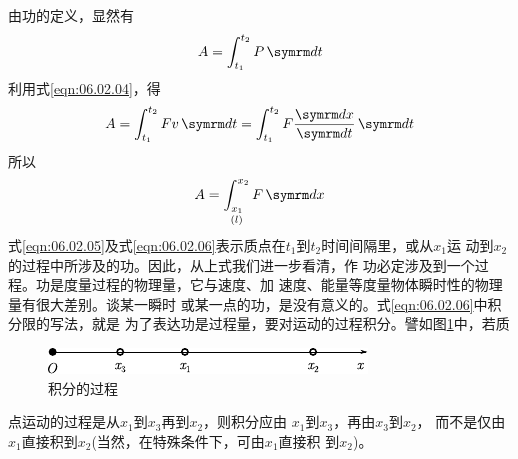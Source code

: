 由功的定义，显然有
\begin{equation}\label{eqn:06.02.05}
 A = \int _ { t _ { 1 } } ^ { t _ { 2 } } P \dif t
\end{equation}
利用式\eqref{eqn:06.02.04}，得
\begin{equation*}
 A = \int _ { t _ { 1 } } ^ { t _ { 2 } } F v \dif t = \int _ { t _ { 1 } } ^ { t_ { 2 } } F \frac { \dif x } { \dif t } \dif t
\end{equation*}
所以\vspace{-1em}
\begin{equation}\label{eqn:06.02.06}
 A = \mathop{\int _ { x _ { 1 } } ^ { x _ { 2 } }}\limits _ { ( l ) } F \dif x
\end{equation}
式\eqref{eqn:06.02.05}及式\eqref{eqn:06.02.06}表示质点在$ t_1 $到$ t_2 $时间间隔里，或从$ x_1 $运
动到$ x_2 $的过程中所涉及的功。因此，从上式我们进一步看清，作
功必定涉及到一个过程。功是度量过程的物理量，它与速度、加
速度、能量等度量物体瞬时性的物理量有很大差别。谈某一瞬时
或某一点的功，是没有意义的。式\eqref{eqn:06.02.06}中积分限的写法，就是
为了表达功是过程量，要对运动的过程积分。譬如图\ref{fig:06.05}\;中，若质
\begin{figure}
    \centering
    \includegraphics{figure/fig06.05}
    \caption{积分的过程}
    \label{fig:06.05}
\end{figure}
点运动的过程是从$ x_1 $到$ x_3 $再到$ x_2 $，则积分应由
$ x_1 $到$ x_3 $，再由$ x_3 $到$ x_2 $，
而不是仅由$ x_1 $直接积到$ x_2 $(当然，在特殊条件下，可由$ x_1 $直接积
到$ x_2 $)。

